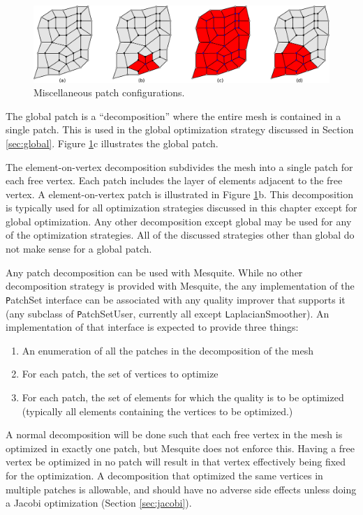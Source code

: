 \begin{figure}[htb]
\includegraphics[width=5in]{patches-horiz}
\caption{Miscellaneous patch configurations.\label{fig:patch-types}}
\end{figure}

The global patch is a ``decomposition'' where the entire mesh is contained in a single patch.  This is used in the global optimization strategy discussed in Section \ref{sec:global}. Figure \ref{fig:patch-types}c illustrates the global patch.

The element-on-vertex decomposition subdivides the mesh into a single patch for each free vertex.  Each patch includes the layer of elements adjacent to the free vertex.  A element-on-vertex patch is illustrated in Figure \ref{fig:patch-types}b.  This decomposition is typically used for all optimization strategies discussed in this chapter except for global optimization.  Any other decomposition except global may be used for any of the optimization strategies.  All of the discussed strategies other than global do not make sense for a global patch.

Any patch decomposition can be used with Mesquite.  While no other decomposition strategy is provided with Mesquite, the any implementation of the {\texttt PatchSet} interface can be associated with any quality improver that supports it (any subclass of {\texttt PatchSetUser}, currently all except {\texttt LaplacianSmoother}).  An implementation of that interface is expected to provide three things:
\begin{enumerate}
\item An enumeration of all the patches in the decomposition of the mesh
\item For each patch, the set of vertices to optimize
\item For each patch, the set of elements for which the quality is to be optimized (typically all elements containing the vertices to be optimized.)
\end{enumerate}
A normal decomposition will be done such that each free vertex in the mesh is optimized in exactly one patch, but Mesquite does not enforce this.  Having a free vertex be optimized in no patch will result in that vertex effectively being fixed for the optimization.  A decomposition that optimized the same vertices in multiple patches is allowable, and should have no adverse side effects unless doing a Jacobi optimization (Section \ref{sec:jacobi}).

